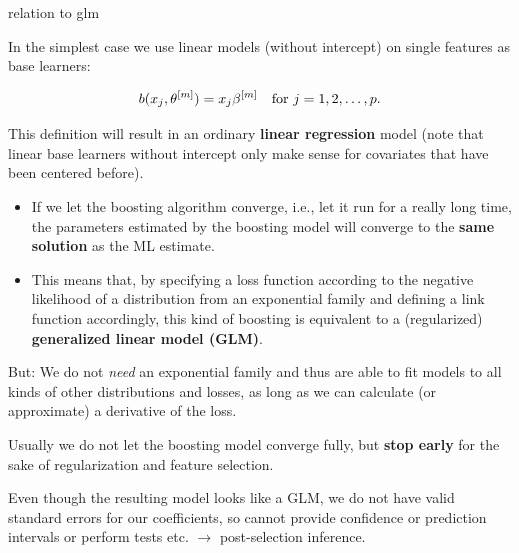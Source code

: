 
\begin{vbframe}{relation to glm}

In the simplest case we use linear models (without intercept) on single features 
as base learners:

$$
  b(x_j,\theta^{[m]}) = x_j \beta^{[m]} \quad \text{for } j = 1, 2, \dots, p.
$$

This definition will result in an ordinary \textbf{linear regression} model 
(note that linear base learners without intercept only make sense for covariates 
that have been centered before).


\lz

\begin{itemize}
  \item If we let the boosting algorithm converge, i.e., let it run for a really 
  long time, the parameters estimated by the boosting model will converge to the 
  \textbf{same solution} as the ML estimate.
  \item This means that, by specifying a loss function according to the negative 
  likelihood of a distribution from an exponential family and defining a link 
  function accordingly, this kind of boosting is equivalent to a (regularized)
  \textbf{generalized linear model (GLM)}.
\end{itemize}

\framebreak


But: We do not \emph{need} an exponential family and thus are able to fit models 
to all kinds of other distributions and losses, as long as we can calculate (or 
approximate) a derivative of the loss. 

\lz

Usually we do not let the boosting model converge fully, but \textbf{stop 
early} for the sake of regularization and feature selection.

\lz

Even though the resulting model looks like a GLM, we do not have valid standard 
errors for our coefficients,
so cannot provide confidence or prediction intervals or perform tests etc.
$\rightarrow$ post-selection inference.

\end{vbframe}

